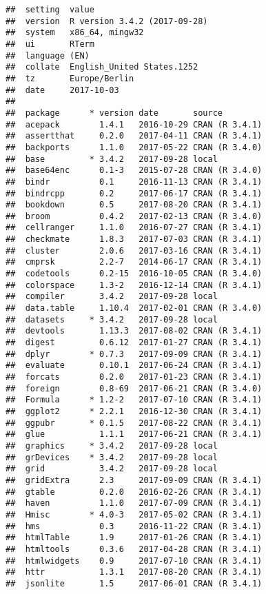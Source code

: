 \documentclass[]{book}
\theoremstyle{definition}
\theoremstyle{definition}
\theoremstyle{definition}
\theoremstyle{remark}
\begin{document}
\begin{verbatim}
##  setting  value                       
##  version  R version 3.4.2 (2017-09-28)
##  system   x86_64, mingw32             
##  ui       RTerm                       
##  language (EN)                        
##  collate  English_United States.1252  
##  tz       Europe/Berlin               
##  date     2017-10-03                  
## 
##  package      * version date       source        
##  acepack        1.4.1   2016-10-29 CRAN (R 3.4.1)
##  assertthat     0.2.0   2017-04-11 CRAN (R 3.4.1)
##  backports      1.1.0   2017-05-22 CRAN (R 3.4.0)
##  base         * 3.4.2   2017-09-28 local         
##  base64enc      0.1-3   2015-07-28 CRAN (R 3.4.0)
##  bindr          0.1     2016-11-13 CRAN (R 3.4.1)
##  bindrcpp       0.2     2017-06-17 CRAN (R 3.4.1)
##  bookdown       0.5     2017-08-20 CRAN (R 3.4.1)
##  broom          0.4.2   2017-02-13 CRAN (R 3.4.0)
##  cellranger     1.1.0   2016-07-27 CRAN (R 3.4.1)
##  checkmate      1.8.3   2017-07-03 CRAN (R 3.4.1)
##  cluster        2.0.6   2017-03-16 CRAN (R 3.4.1)
##  cmprsk         2.2-7   2014-06-17 CRAN (R 3.4.1)
##  codetools      0.2-15  2016-10-05 CRAN (R 3.4.0)
##  colorspace     1.3-2   2016-12-14 CRAN (R 3.4.1)
##  compiler       3.4.2   2017-09-28 local         
##  data.table     1.10.4  2017-02-01 CRAN (R 3.4.0)
##  datasets     * 3.4.2   2017-09-28 local         
##  devtools       1.13.3  2017-08-02 CRAN (R 3.4.1)
##  digest         0.6.12  2017-01-27 CRAN (R 3.4.1)
##  dplyr        * 0.7.3   2017-09-09 CRAN (R 3.4.1)
##  evaluate       0.10.1  2017-06-24 CRAN (R 3.4.1)
##  forcats        0.2.0   2017-01-23 CRAN (R 3.4.1)
##  foreign        0.8-69  2017-06-21 CRAN (R 3.4.0)
##  Formula      * 1.2-2   2017-07-10 CRAN (R 3.4.1)
##  ggplot2      * 2.2.1   2016-12-30 CRAN (R 3.4.1)
##  ggpubr       * 0.1.5   2017-08-22 CRAN (R 3.4.1)
##  glue           1.1.1   2017-06-21 CRAN (R 3.4.1)
##  graphics     * 3.4.2   2017-09-28 local         
##  grDevices    * 3.4.2   2017-09-28 local         
##  grid           3.4.2   2017-09-28 local         
##  gridExtra      2.3     2017-09-09 CRAN (R 3.4.1)
##  gtable         0.2.0   2016-02-26 CRAN (R 3.4.1)
##  haven          1.1.0   2017-07-09 CRAN (R 3.4.1)
##  Hmisc        * 4.0-3   2017-05-02 CRAN (R 3.4.1)
##  hms            0.3     2016-11-22 CRAN (R 3.4.1)
##  htmlTable      1.9     2017-01-26 CRAN (R 3.4.1)
##  htmltools      0.3.6   2017-04-28 CRAN (R 3.4.1)
##  htmlwidgets    0.9     2017-07-10 CRAN (R 3.4.1)
##  httr           1.3.1   2017-08-20 CRAN (R 3.4.1)
##  jsonlite       1.5     2017-06-01 CRAN (R 3.4.1)

\end{verbatim}
\end{document}
